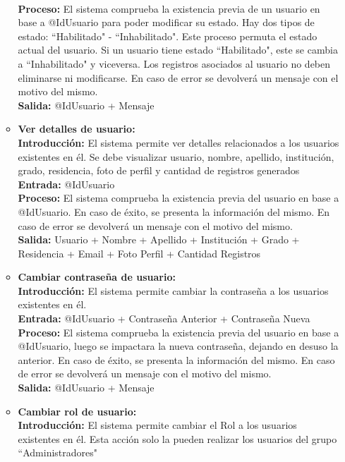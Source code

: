 \begin{enumerate}[A.]
\begin{itemize}
            \\ \textbf{Proceso:} El sistema comprueba la existencia previa de un usuario en base a @IdUsuario para poder modificar su estado. Hay dos tipos de estado: ``Habilitado" - ``Inhabilitado". Este proceso permuta el estado actual del usuario. Si un usuario tiene estado ``Habilitado", este se cambia a ``Inhabilitado" y viceversa. Los registros asociados al usuario no deben eliminarse ni modificarse. En caso de error se devolverá un mensaje con el motivo del mismo.
            \\ \textbf{Salida:} @IdUsuario + Mensaje
            \\
          \item \textbf{Ver detalles de usuario:}
            \\ \textbf{Introducción:} El sistema permite ver detalles relacionados a los usuarios existentes en él. Se debe visualizar usuario, nombre, apellido, institución, grado, residencia, foto de perfil y cantidad de registros generados
            \\ \textbf{Entrada:} @IdUsuario
            \\ \textbf{Proceso:} El sistema comprueba la existencia previa del usuario en base a @IdUsuario. En caso de éxito, se presenta la información del mismo. En caso de error se devolverá un mensaje con el motivo del mismo.
            \\ \textbf{Salida:} Usuario + Nombre + Apellido + Institución + Grado + Residencia + Email + Foto Perfil + Cantidad Registros
            \\
          \item \textbf{Cambiar contraseña de usuario:}
            \\ \textbf{Introducción:} El sistema permite cambiar la contraseña a los usuarios existentes en él.
            \\ \textbf{Entrada:} @IdUsuario + Contraseña Anterior + Contraseña Nueva
            \\ \textbf{Proceso:} El sistema comprueba la existencia previa del usuario en base a @IdUsuario, luego se impactara la nueva contraseña, dejando en desuso la anterior. En caso de éxito, se presenta la información del mismo. En caso de error se devolverá un mensaje con el motivo del mismo.
            \\ \textbf{Salida:} @IdUsuario + Mensaje
            \\
          \item \textbf{Cambiar rol de usuario:}
            \\ \textbf{Introducción:} El sistema permite cambiar el Rol a los usuarios existentes en él. Esta acción solo la pueden realizar los usuarios del grupo ``Administradores"

\end{itemize}
\end{enumerate}
